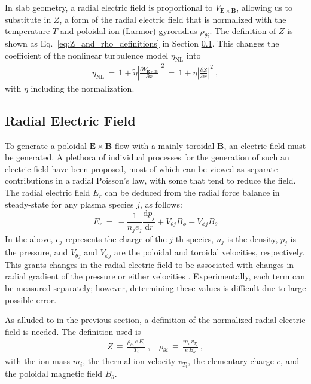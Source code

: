 In slab geometry, a radial electric field is proportional to $V_{\mathbf{E}\times\mathbf{B}}$, allowing us to substitute in $Z$, a form of the radial electric field that is normalized with the temperature $T$ and poloidal ion (Larmor) gyroradius $\rho_{\theta i}$.
The definition of $Z$ is shown as Eq.~\ref{eq:Z_and_rho_definitions} in Section \ref{ssec:E_r}.
This changes the coefficient of the nonlinear turbulence model $\eta_\text{NL}$ into
\begin{align} %
	\eta_\text{NL} \,=\, 1 +
		\tilde{\eta} \left|\frac{\partial V_{\mathbf{E}\times\mathbf{B}}}{\partial x}\right|^2
		\,=\, 1 + \eta\left|\frac{\partial Z}{\partial x}\right|^2~,
	\label{eq:saturation_normalization}
\end{align}
with $\eta$ including the normalization.

\subsection{Radial Electric Field}\label{ssec:E_r}
To generate a poloidal $\mathbf{E}\times\mathbf{B}$ flow with a mainly toroidal $\mathbf{B}$, an electric field must be generated.
A plethora of individual processes for the generation of such an electric field have been proposed, most of which can be viewed as separate contributions in a radial Poisson's law, with some that tend to reduce the field.
The radial electric field $E_r$ can be deduced from the radial force balance in steady-state for any plasma species $j$, as follows:
\begin{equation} %
	E_r \,=\, -\frac{1}{n_j e_j} \frac{\text{d} p_j}{\text{d} r} + V_{\theta j} B_\phi - V_{\phi j} B_\theta
	\label{eq:E_r}
\end{equation}
In the above, $e_j$ represents the charge of the $j$-th species, $n_j$ is the density, $p_j$ is the pressure, and $V_{\theta j}$ and $V_{\phi j}$ are the poloidal and toroidal velocities, respectively.
This grants changes in the radial electric field to be associated with changes in radial gradient of the pressure or either velocities \cite{connor_review_2000}.
Experimentally, each term can be measured separately; however, determining these values is difficult due to large possible error.

As alluded to in the previous section, a definition of the normalized radial electric field is needed.
The definition used is
\begin{align} %
	Z \,\equiv\, \frac{\rho_{\theta i} \, e \, E_r}{T_i}~, ~~~~
		\rho_{\theta i} \,\equiv\, \frac{m_i \, v_{T_i}}{e \, B_\theta}~,
		\label{eq:Z_and_rho_definitions}
\end{align}
with the ion mass $m_i$, the thermal ion velocity $v_{T_i}$, the elementary charge $e$, and the poloidal magnetic field $B_\theta$.


